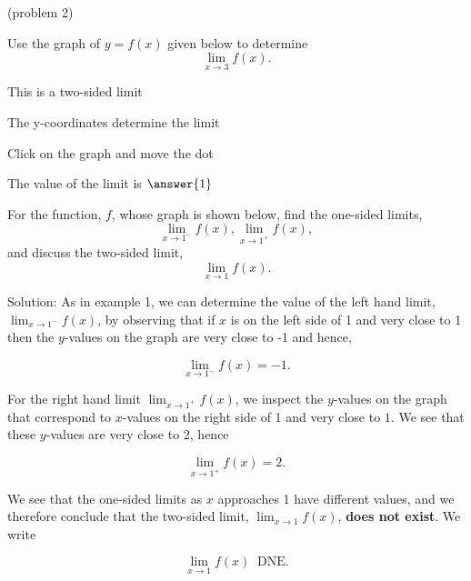 \documentclass[handout]{ximera}
\begin{document}
\begin{problem}(problem 2)




Use the graph of $y = f(x)$ given below to determine
  \[
  \lim_{x\to 3} f(x).
  \]
  
    \begin{hint}
      This is a two-sided limit
    \end{hint}
    \begin{hint}
      The y-coordinates determine the limit
    \end{hint}
		\begin{hint}
		  Click on the graph and move the dot
		\end{hint}
		The value of the limit is
		 $\answer{1}$

	
\end{problem}

\begin{example}[example 3]
For the function, $f$, whose graph is shown below, find the one-sided limits,
\[\lim_{x \to 1^-}f(x), \lim_{x \to 1^+}f(x),
\] 
and discuss the two-sided limit, 
\[\lim_{x \to 1} f(x).
\]





\vspace{.25in}
Solution: As in example 1, we can determine the value of the left hand limit, $\lim_{x \to 1^-}f(x)$, 
by observing that if $x$ is on the left side of 1 and very close to 1 then the $y$-values on the 
graph are very close to -1 and hence, 

\[
\lim_{x \to 1^-}f(x) = -1.
\]

For the right hand limit $\lim_{x \to 1^+}f(x)$, we inspect the $y$-values on the 
graph that correspond to $x$-values on the right side of 1 and very close to $1$.  
We see that these $y$-values are very close to 2, hence

\[
\lim_{x \to 1^+}f(x) = 2.
\]

We see that the one-sided limits as $x$ approaches 1 have different values, and we therefore 
conclude that the two-sided limit, $\lim_{x \to 1}f(x)$, \textbf{does not exist}.  We write

\[
\lim_{x \to 1}f(x) \;\;\text{DNE}.
\]

\end{example}
\end{document}
